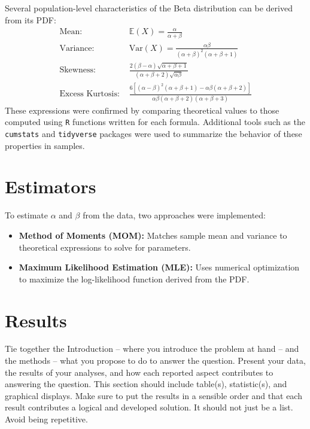\documentclass{article}\usepackage[]{graphicx}\usepackage[]{xcolor}
\begin{document}
\begin{multicols}{2}
Several population-level characteristics of the Beta distribution can be derived from its PDF:
\begin{align*}
\text{Mean: } & \mathbb{E}(X) = \frac{\alpha}{\alpha + \beta} \\
\text{Variance: } & \text{Var}(X) = \frac{\alpha \beta}{(\alpha + \beta)^2 (\alpha + \beta + 1)} \\
\text{Skewness: } & \frac{2(\beta - \alpha) \sqrt{\alpha + \beta + 1}}{(\alpha + \beta + 2) \sqrt{\alpha \beta}} \\
\text{Excess Kurtosis: } & \frac{6[(\alpha - \beta)^2 (\alpha + \beta + 1) - \alpha \beta (\alpha + \beta + 2)]}{\alpha \beta (\alpha + \beta + 2)(\alpha + \beta + 3)}
\end{align*}
These expressions were confirmed by comparing theoretical values to those computed using \texttt{R} functions written for each formula. Additional tools such as the \texttt{cumstats} and \texttt{tidyverse} packages were used to summarize the behavior of these properties in samples.

\section{Estimators}

To estimate $\alpha$ and $\beta$ from the data, two approaches were implemented: 
\begin{itemize}
\item \textbf{Method of Moments (MOM):} Matches sample mean and variance to theoretical expressions to solve for parameters.
\item \textbf{Maximum Likelihood Estimation (MLE):} Uses numerical optimization to maximize the log-likelihood function derived from the PDF.
\end{itemize}



\section{Results}
Tie together the Introduction -- where you introduce the problem at hand -- and the methods --  what you propose to do to answer the question. Present your data, the results of your analyses, and how each reported aspect contributes to answering the question. This section should include table(s), statistic(s), and graphical displays. Make sure to put the results in a sensible order and that each result contributes a logical and developed solution. It should not just be a list. Avoid being repetitive. 


\end{multicols}
\end{document}
